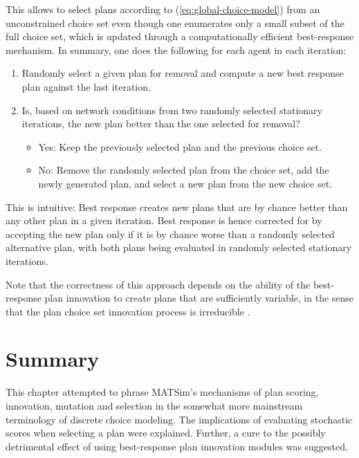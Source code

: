 This allows to select plans according to (\ref{eq:global-choice-model})
from an unconstrained choice set even though one enumerates only a
small subset of the full choice set, which is updated through a computationally
efficient best-response mechanism. In summary, one does the following
for each agent in each iteration:
\begin{enumerate}
\item Randomly select a given plan for removal and compute a new best response
plan against the last iteration.
\item Is, based on network conditions from two randomly selected stationary
iterations, the new plan better than the one selected for removal?

\begin{itemize}
\item Yes: Keep the previously selected plan and the previous choice set.
\item No: Remove the randomly selected plan from the choice set, add the
newly generated plan, and select a new plan from the new choice set.
\end{itemize}
\end{enumerate}
This is intuitive: Best response creates new plans that are by chance
better than any other plan in a given iteration. Best response is
hence corrected for by accepting the new plan only if it is by chance
worse than a randomly selected alternative plan, with both plans being
evaluated in randomly selected stationary iterations.

Note that the correctness of this approach depends on the ability
of the best-response plan innovation to create plans that are sufficiently
variable, in the sense that the plan choice set innovation process
is irreducible \citep{ross-2006}.


\section{\label{sec:Summary}Summary}

This chapter attempted to phrase MATSim's mechanisms of plan scoring,
innovation, mutation and selection in the somewhat more mainstream
terminology of discrete choice modeling. The implications of evaluating
stochastic scores when selecting a plan were explained. Further, a
cure to the possibly detrimental effect of using best-response plan
innovation modules was suggested.

